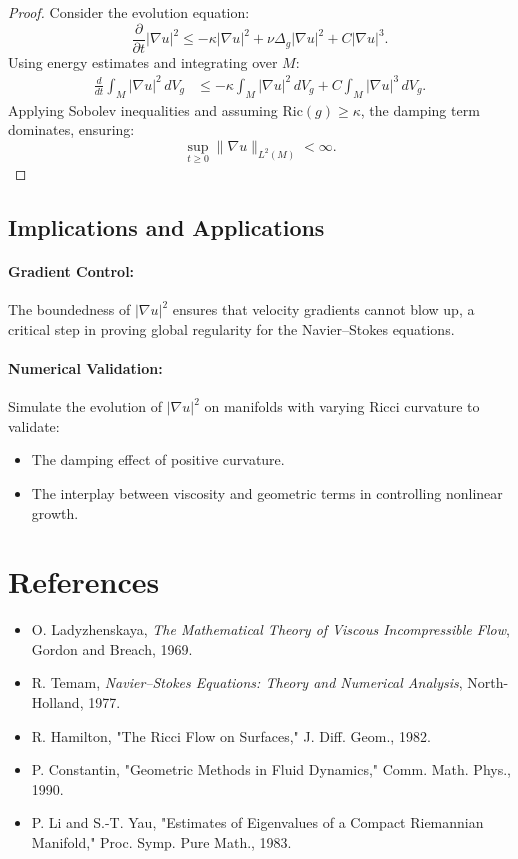 \documentclass[12pt]{article}
\theoremstyle{definition}
\begin{document}
\begin{proof}
Consider the evolution equation:
\[
\frac{\partial}{\partial t} |\nabla u|^2 \leq - \kappa |\nabla u|^2 + \nu \Delta_g |\nabla u|^2 + C |\nabla u|^3.
\]
Using energy estimates and integrating over $M$:
\begin{align*}
\frac{d}{dt} \int_M |\nabla u|^2 \, dV_g &\leq - \kappa \int_M |\nabla u|^2 \, dV_g + C \int_M |\nabla u|^3 \, dV_g.
\end{align*}
Applying Sobolev inequalities and assuming $\text{Ric}(g) \geq \kappa$, the damping term dominates, ensuring:
\[
\sup_{t \geq 0} \| \nabla u \|_{L^2(M)} < \infty.
\]
\end{proof}

\subsection{Implications and Applications}
\paragraph{Gradient Control:}
The boundedness of $|\nabla u|^2$ ensures that velocity gradients cannot blow up, a critical step in proving global regularity for the Navier--Stokes equations.

\paragraph{Numerical Validation:}
Simulate the evolution of $|\nabla u|^2$ on manifolds with varying Ricci curvature to validate:
\begin{itemize}
    \item The damping effect of positive curvature.
    \item The interplay between viscosity and geometric terms in controlling nonlinear growth.
\end{itemize}

\section*{References}
\begin{itemize}
    \item O. Ladyzhenskaya, \emph{The Mathematical Theory of Viscous Incompressible Flow}, Gordon and Breach, 1969.
    \item R. Temam, \emph{Navier--Stokes Equations: Theory and Numerical Analysis}, North-Holland, 1977.
    \item R. Hamilton, "The Ricci Flow on Surfaces," J. Diff. Geom., 1982.
    \item P. Constantin, "Geometric Methods in Fluid Dynamics," Comm. Math. Phys., 1990.
    \item P. Li and S.-T. Yau, "Estimates of Eigenvalues of a Compact Riemannian Manifold," Proc. Symp. Pure Math., 1983.
\end{itemize}
\end{document}
